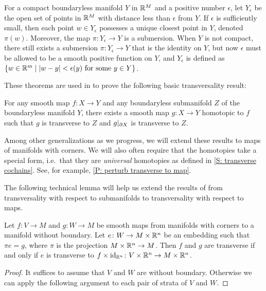 \begin{remark}
\begin{theorem}
	For a compact boundaryless manifold $Y$ in $\mathbb{R}^M$ and a positive number $\epsilon$, let $Y_\epsilon$ be the open set of points in $\mathbb{R}^M$ with distance less than $\epsilon$ from $Y$.
	If $\epsilon$ is sufficiently small, then each point $w\in Y_\epsilon$ possesses a unique closest point in $Y$, denoted $\pi(w)$.
	Moreover, the map $\pi \colon Y_\epsilon\to Y$ is a submersion.
	When $Y$ is not compact, there still exists a submersion $\pi \colon Y_\epsilon\to Y$ that is the identity on $Y$, but now $\epsilon$ must be allowed to be a smooth positive function on $Y$, and $Y_\epsilon$ is defined as $\{w\in \mathbb{R}^m \mid |w-y|<\epsilon(y) \text{\ for some\ } y \in Y\}$.
\end{theorem}

These theorems are used in \cite{GuPo74} to prove the following basic transversality result:

\begin{theorem}
	For any smooth map $f \colon X\to Y$ and any boundaryless submanifold $Z$ of the boundaryless manifold $Y$, there exists a smooth map $g \colon X\to Y$ homotopic to $f$ such that $g$ is transverse to $Z$ and $g|_{\partial X}$ is transverse to $Z$.
\end{theorem}

Among other generalizations as we progress, we will extend these results to maps of manifolds with corners.
We will also often require that the homotopies take a special form, i.e.\ that they are {\it universal} homotopies as defined in \cref{S: transverse cochains}.
See, for example, \cref{P: perturb transverse to map}.

The following technical lemma will help us extend the results of \cite{GuPo74} from transversality with respect to submanifolds to transversality with respect to maps.

\begin{lemma}\label{L: all transversality is wrt embeddings}
	Let $f \colon V\to M$ and $g \colon W\to M$ be smooth maps from manifolds with corners to a manifold without boundary.
	Let $e \colon W\to M\times \mathbb{R}^n$ be an embedding such that $\pi e=g$, where $\pi$ is the projection $M\times \mathbb{R}^n\to M$.
	Then $f$ and $g$ are transverse if and only if $e$ is transverse to $f\times\mathrm{id}_{\mathbb{R}^n} \colon V\times \mathbb{R}^n\to M\times \mathbb{R}^n$.
\end{lemma}

\begin{proof}
	It suffices to assume that $V$ and $W$ are without boundary.
	Otherwise we can apply the following argument to each pair of strata of $V$ and $W$.


\end{proof}
\end{remark}
